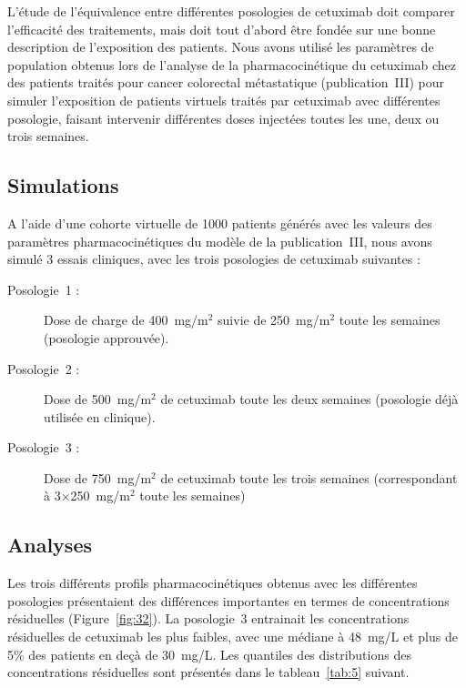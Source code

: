 L'étude de l'équivalence entre différentes posologies de cetuximab doit comparer l'efficacité des traitements, mais doit tout d'abord être fondée sur une bonne description de l'exposition des patients. Nous avons utilisé les paramètres de population obtenus lors de l'analyse de la pharmacocinétique du cetuximab chez des patients traités pour cancer colorectal métastatique (publication~III) pour simuler l'exposition de patients virtuels traités par cetuximab avec différentes posologie, faisant intervenir différentes doses injectées toutes les une, deux ou trois semaines.
\subsection{Simulations}
A l'aide d'une cohorte virtuelle de 1000 patients générés avec les valeurs des paramètres pharmacocinétiques du modèle de la publication~III, nous avons simulé 3 essais cliniques, avec les trois posologies de cetuximab suivantes :
\begin{description}
\item[Posologie~1 :] Dose de charge de 400~mg/m$^2$ suivie de 250~mg/m$^2$ toute les semaines (posologie approuvée).
\item[Posologie~2 :] Dose de 500~mg/m$^2$ de cetuximab toute les deux semaines (posologie déjà utilisée en clinique).
\item[Posologie~3 :] Dose de 750~mg/m$^2$ de cetuximab toute les trois semaines (correspondant à 3$\times$250~mg/m$^2$ toute les semaines)
\end{description}

\subsection{Analyses}
Les trois différents profils pharmacocinétiques obtenus avec les différentes posologies présentaient des différences importantes en termes de concentrations résiduelles (Figure~\ref{fig:32}). La posologie~3 entrainait les concentrations résiduelles de cetuximab les plus faibles, avec une médiane à 48~mg/L et plus de 5\% des patients en deçà de 30~mg/L. Les quantiles des distributions des concentrations résiduelles sont présentés dans le tableau~\ref{tab:5} suivant. 



